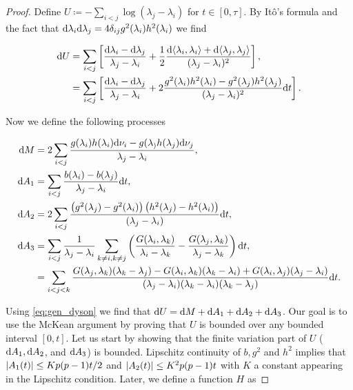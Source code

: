 \begin{proof}

    
    
    Define $U \coloneqq -\sum_{i<j} \log(\lambda_j - \lambda_i)$ for $t\in [0,\tau]$. By Itô's formula and the fact that $\mathrm d \lambda_i\mathrm d\lambda_j = 4\delta_{ij}g^2(\lambda_i)h^2(\lambda_i)$ we find

    \begin{align*}
        \mathrm d U &= \sum_{i < j} \left[\frac{\mathrm d \lambda_i - \mathrm d \lambda_j}{\lambda_j - \lambda_i} + \frac12\frac{\mathrm d\langle \lambda_i, \lambda_i \rangle + \mathrm d\langle \lambda_j, \lambda_j \rangle}{(\lambda_j - \lambda_i)^2}\right],\\
        &= \sum_{i<j} \left[\frac{\mathrm d \lambda_i - \mathrm d \lambda_j}{\lambda_j - \lambda_i} + 2\frac{g^2(\lambda_i)h^2(\lambda_i)-g^2(\lambda_j)h^2(\lambda_j)}{(\lambda_j - \lambda_i)^2}\mathrm d t\right].
    \end{align*}

    Now we define the following processes

    \begin{align*}
        \mathrm d M &= 2 \sum_{i<j} \frac{g(\lambda_i)h(\lambda_i)\mathrm d \nu_i - g(\lambda_)h(\lambda_j)\mathrm d \nu_j}{\lambda_j - \lambda_i},\\
        \mathrm d A_1 &= \sum_{i<j} \frac{b(\lambda_i) - b(\lambda_j)}{\lambda_j - \lambda_i}\mathrm d t,\\
        \mathrm d A_2 &= 2\sum_{i<j} \frac{\left( g^2(\lambda_j) - g^2(\lambda_i) \right)\left(h^2(\lambda_j) - h^2(\lambda_i)\right)}{(\lambda_j - \lambda_i)}\mathrm d t,\\
        \mathrm d A_3 &= \sum_{i<j}\frac{1}{\lambda_j-\lambda_i}\sum_{k\neq i, k \neq j}\left( \frac{G(\lambda_i,\lambda_k)}{\lambda_i-\lambda_k} - \frac{G(\lambda_j,\lambda_k)}{\lambda_j - \lambda_k} \right) \mathrm d t,\\
        &= \sum_{i<j<k} \frac{G(\lambda_j,\lambda_k)(\lambda_k-\lambda_j)-G(\lambda_i,\lambda_k)(\lambda_k-\lambda_i)+G(\lambda_i,\lambda_j)(\lambda_j-\lambda_i)}{(\lambda_j-\lambda_i)(\lambda_k-\lambda_i)(\lambda_k-\lambda_j)}\mathrm d t.
    \end{align*}

    Using \eqref{eq:gen_dyson} we find that $\mathrm d U = \mathrm d M + \mathrm d A_1 + \mathrm d A_2 + \mathrm d A_3$. Our goal is to use the McKean argument by proving that $U$ is bounded over any bounded interval $[0,t]$. Let us start by showing that the finite variation part of $U$ ($\mathrm d A_1, \mathrm d A_2$, and $\mathrm d A_3$) is bounded. Lipschitz continuity of $b,g^2$ and $h^2$ implies that $\lvert A_1(t) \rvert\le Kp(p-1)t/2$ and $\lvert A_2(t) \rvert\le K^2p(p-1)t$ with $K$ a constant appearing in the Lipschitz condition. Later, we define a function $H$ as


\end{proof}
